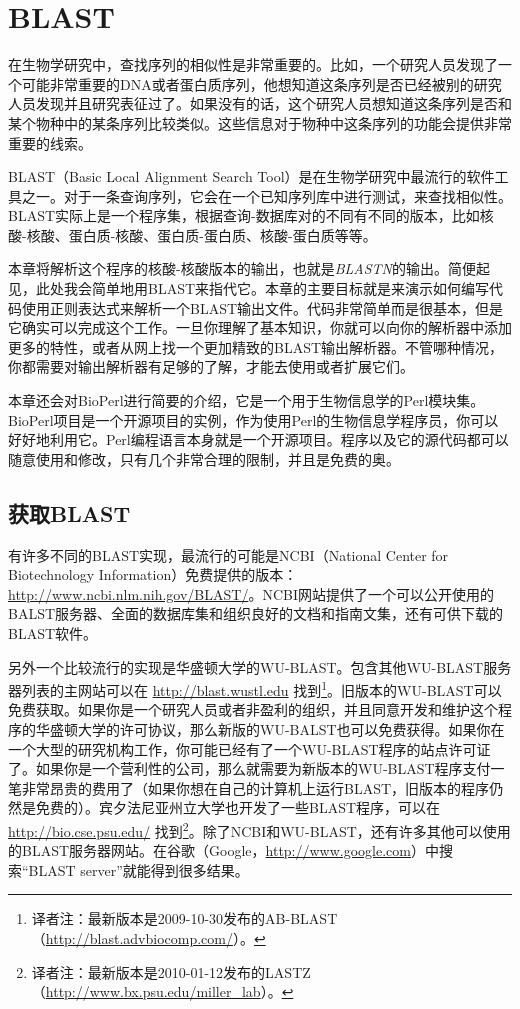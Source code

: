 \chapter{BLAST}
\label{chap:chapter12}
\minitoc

在生物学研究中，查找序列的相似性是非常重要的。比如，一个研究人员发现了一个可能非常重要的DNA或者蛋白质序列，他想知道这条序列是否已经被别的研究人员发现并且研究表征过了。如果没有的话，这个研究人员想知道这条序列是否和某个物种中的某条序列比较类似。这些信息对于物种中这条序列的功能会提供非常重要的线索。

BLAST（Basic Local Alignment Search Tool）是在生物学研究中最流行的软件工具之一。对于一条查询序列，它会在一个已知序列库中进行测试，来查找相似性。BLAST实际上是一个程序集，根据查询-数据库对的不同有不同的版本，比如核酸-核酸、蛋白质-核酸、蛋白质-蛋白质、核酸-蛋白质等等。

本章将解析这个程序的核酸-核酸版本的输出，也就是\textit{BLASTN}的输出。简便起见，此处我会简单地用BLAST来指代它。本章的主要目标就是来演示如何编写代码使用正则表达式来解析一个BLAST输出文件。代码非常简单而是很基本，但是它确实可以完成这个工作。一旦你理解了基本知识，你就可以向你的解析器中添加更多的特性，或者从网上找一个更加精致的BLAST输出解析器。不管哪种情况，你都需要对输出解析器有足够的了解，才能去使用或者扩展它们。

本章还会对BioPerl进行简要的介绍，它是一个用于生物信息学的Perl模块集。BioPerl项目是一个开源项目的实例，作为使用Perl的生物信息学程序员，你可以好好地利用它。Perl编程语言本身就是一个开源项目。程序以及它的源代码都可以随意使用和修改，只有几个非常合理的限制，并且是免费的奥。

\section{获取BLAST}
有许多不同的BLAST实现，最流行的可能是NCBI（National Center for Biotechnology Information）免费提供的版本：\href{http://www.ncbi.nlm.nih.gov/BLAST/}{http://www.ncbi.nlm.nih.gov/BLAST/}。NCBI网站提供了一个可以公开使用的BALST服务器、全面的数据库集和组织良好的文档和指南文集，还有可供下载的BLAST软件。

另外一个比较流行的实现是华盛顿大学的WU-BLAST。包含其他WU-BLAST服务器列表的主网站可以在 \href{http://blast.wustl.edu}{http://blast.wustl.edu} 找到\footnote{译者注：最新版本是2009-10-30发布的AB-BLAST（\href{http://blast.advbiocomp.com/}{http://blast.advbiocomp.com/}）。}。旧版本的WU-BLAST可以免费获取。如果你是一个研究人员或者非盈利的组织，并且同意开发和维护这个程序的华盛顿大学的许可协议，那么新版的WU-BALST也可以免费获得。如果你在一个大型的研究机构工作，你可能已经有了一个WU-BLAST程序的站点许可证了。如果你是一个营利性的公司，那么就需要为新版本的WU-BLAST程序支付一笔非常昂贵的费用了（如果你想在自己的计算机上运行BLAST，旧版本的程序仍然是免费的）。宾夕法尼亚州立大学也开发了一些BLAST程序，可以在 \href{http://bio.cse.psu.edu/}{http://bio.cse.psu.edu/} 找到\footnote{译者注：最新版本是2010-01-12发布的LASTZ（\href{http://www.bx.psu.edu/miller\_lab}{http://www.bx.psu.edu/miller\_lab}）。}。除了NCBI和WU-BLAST，还有许多其他可以使用的BLAST服务器网站。在谷歌（Google，\href{http://www.google.com}{http://www.google.com}）中搜索“BLAST server”就能得到很多结果。

